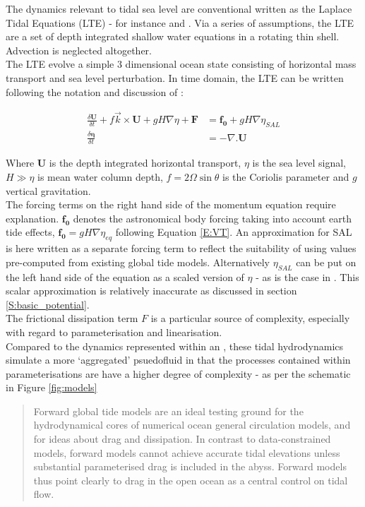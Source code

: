 The dynamics relevant to tidal sea level are conventional written as the Laplace Tidal Equations (LTE) - for instance \cite[9.8]{gill1982atmosphere} and \cite{Hendershott:1981ub}.   
Via a series of assumptions, the LTE are a set of depth integrated shallow water equations in a rotating thin shell.  Advection is neglected altogether.\\
The LTE evolve a simple 3 dimensional ocean state consisting of horizontal mass transport and sea level perturbation. In time domain, the LTE can be written following the notation and discussion of \cite[pp185]{Egbert:2002ug}:

\begin{align}
\label{E:LTE_momtm}
\frac{\delta \mathbf{U} }{ \delta t} + f\vec{k} \times \mathbf{U} + gH\nabla \eta  + \mathbf{F} &= \mathbf{f_0} + gH \nabla \eta_{SAL} \\
\label{E:LTE_cont}
\frac{\delta \mathbf{\eta} }{\delta t} &= -\nabla.\mathbf{U} 
\end{align}

Where $\mathbf{U}$ is the depth integrated horizontal transport, $\eta$ is the sea level signal, $H \gg \eta$ is mean water column depth, $f=2\Omega\sin\theta$ is the Coriolis parameter and $g$ vertical gravitation.\\
The forcing terms on the right hand side of the momentum equation \label{E:LTE_momtm} require explanation.  
$\mathbf{f_0}$ denotes the astronomical body forcing taking into account earth tide effects, $\mathbf{f_0} = gH\nabla\eta_{eq}$ following Equation \ref{E:VT}.  
An approximation for SAL is here written as a separate forcing term to reflect the suitability of using values pre-computed from existing global tide models.   
Alternatively $\eta_{SAL}$ can be put on the left hand side of the equation as a scaled version of $\eta$ - as is the case in \MOM{}.   
This scalar approximation is relatively inaccurate as discussed in section \ref{S:basic_potential}.\\
The frictional dissipation term $F$ is a particular source of complexity, especially with regard to parameterisation and linearisation.\\

Compared to the dynamics represented within an \OGCM{}, these tidal hydrodynamics simulate a more `aggregated' psuedofluid in that the processes contained within parameterisations are have a higher degree of complexity - as per the schematic in Figure \ref{fig:models} \\
\begin{quotation}
Forward global tide models are an ideal testing ground for the hydrodynamical cores of numerical ocean general circulation models, and for ideas about drag and dissipation. In contrast to data-constrained models, forward models cannot achieve accurate tidal elevations unless substantial parameterised drag is included in the abyss. Forward models thus point clearly to drag in the open ocean as a central control on tidal flow.\citep{Arbic:2004wz}
\end{quotation} 


